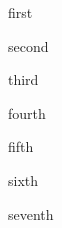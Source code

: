 \documentclass[notebook]{guildcamp4} %
\begin{document}
\startnotebook{\nJoanBooklet{}}

\begin{page}{first}



\end{page}

\begin{page}{second}



\end{page}

\begin{page}{third}



\end{page}

\begin{page}{fourth}



\end{page}

\begin{page}{fifth}



\end{page}

\begin{page}{sixth}



\end{page}

\begin{page}{seventh}



\end{page}

\endnotebook
\end{document}
